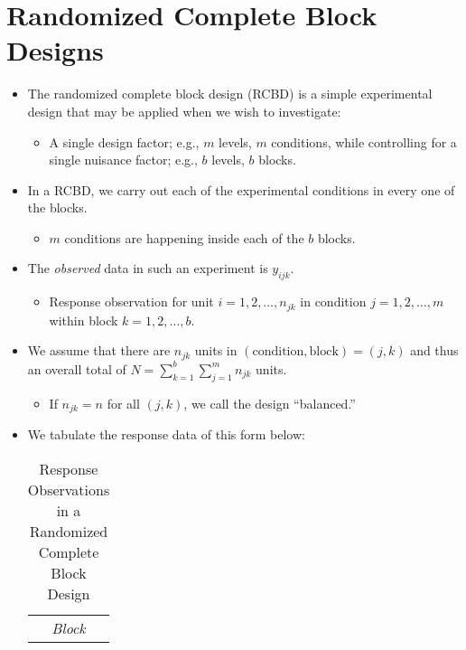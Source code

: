 \section{Randomized Complete Block Designs}
\begin{itemize}
      \item The randomized complete block design (RCBD) is a simple experimental design that may be applied
            when we wish to investigate:
            \begin{itemize}
                  \item A single design factor; e.g., $ m $ levels, $ m $ conditions, while controlling for a single nuisance factor; e.g., $ b $ levels, $ b $ blocks.
            \end{itemize}
      \item In a RCBD, we carry out each of the experimental conditions in every one of the blocks.
            \begin{itemize}
                  \item $ m $ conditions are happening inside each of the $ b $ blocks.
            \end{itemize}
      \item The \emph{observed} data in such an experiment is $ y_{ijk} $.
            \begin{itemize}
                  \item Response observation for unit $ i=1,2,\ldots,n_{jk} $ in condition $ j=1,2,\ldots,m $
                        within block $ k=1,2,\ldots,b $.
            \end{itemize}
      \item We assume that there are $n_{jk}$ units in $ (\text{condition}, \text{block}) = (j, k) $ and thus an overall total of
            $ N=\sum_{k=1}^{b} \sum_{j=1}^{m} n_{jk} $ units.
            \begin{itemize}
                  \item If $ n_{jk}=n $ for all $ (j,k) $, we call the design ``balanced.''
            \end{itemize}
      \item We tabulate the response data of this form below:
            \begin{table}[!htbp]
                  \centering
                  \caption{Response Observations in a Randomized Complete Block Design}
                  \begin{NiceTabular}{cc|cccc|c}
                               &  &                                                                                                                                                                                                                           \\

\end{NiceTabular}
\end{table}
\end{itemize}
